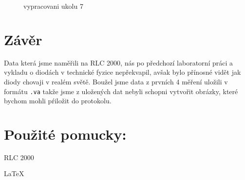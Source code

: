 \documentclass[a4paper]{article}
\begin{document}
\begin{enumerate}
\begin{figure}[H]
		\caption{vypracovani ukolu 7}
		\label{fig:mesh9}
	\end{figure}
\end{enumerate}


\section*{Závěr}
Data která jsme naměřili na RLC 2000, nás po předchozí laboratorní práci a vykladu o diodách v technické fyzice nepřekvapil, avšak bylo přínosné vidět jak diody chovaji v realém světě. Boužel jsme data z prvních 4 měření uložili v formátu \texttt{.va} takže jsme z uložených dat nebyli schopni vytvořit obrázky, které bychom mohli pŕiložit do protokolu.

\section*{Použité pomucky:}
\begin{list}{}{}
	\item \Large{RLC 2000}
	\item \Large{\LaTeX}
\end{list}
\end{document}
